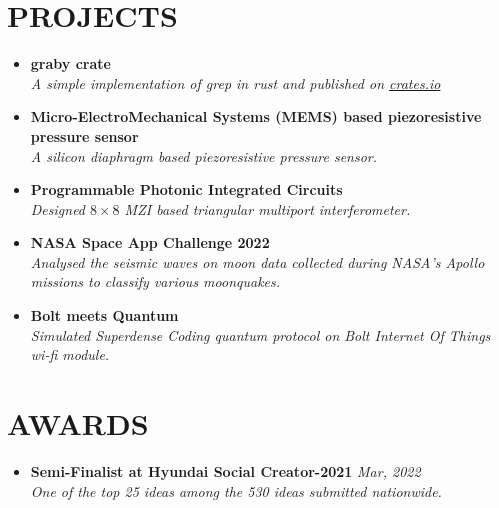 \documentclass[12pt]{my_cv}
\begin{document}
\section{PROJECTS}
\begin{itemize}
\item \textbf{graby crate}
\\ \textit{A simple implementation of grep in rust and published on \href{https://crates.io/crates/graby}{crates.io}}
\item \textbf{Micro-ElectroMechanical Systems (MEMS) based piezoresistive pressure sensor}
\\\textit{A silicon diaphragm based piezoresistive pressure sensor.}
\item \textbf{Programmable Photonic Integrated Circuits}
\\\textit{Designed $8 \times 8$ MZI based triangular multiport interferometer.}
\item \textbf{NASA Space App Challenge 2022}
\\\textit{Analysed the seismic waves on moon data collected during NASA’s Apollo missions to classify various moonquakes.}
\item \textbf{Bolt meets Quantum}
\\\textit{Simulated Superdense Coding quantum protocol on Bolt Internet Of Things wi-fi module.}
\end{itemize}
\section{AWARDS}
\begin{itemize}
\item \textbf{Semi-Finalist at Hyundai Social Creator-2021} \hfill \textit{Mar, 2022}
\\\textit{One of the top 25 ideas among the 530 ideas submitted nationwide.}
\end{itemize}
\end{document}

